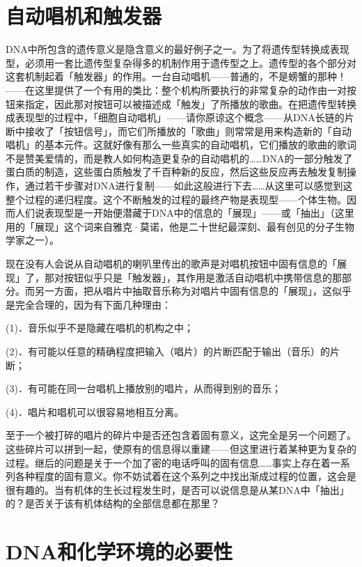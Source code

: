 \documentclass[
  12pt,
  twoside,
  openright,
  oldfontcommands,
]{memoir}
\begin{document}
\section{自动唱机和触发器}

DNA中所包含的遗传意义是隐含意义的最好例子之一。为了将遗传型转换成表现型，必须用一套比遗传型复杂得多的机制作用于遗传型之上。遗传型的各个部分对这套机制起着「触发器」的作用。一台自动唱机------普通的，不是螃蟹的那种！------在这里提供了一个有用的类比：整个机构所要执行的非常复杂的动作由一对按钮来指定，因此那对按钮可以被描述成「触发」了所播放的歌曲。在把遗传型转换成表现型的过程中，「细胞自动唱机」------请你原谅这个概念------从DNA长链的片断中接收了「按钮信号」，而它们所播放的「歌曲」则常常是用来构造新的「自动唱机」的基本元件。这就好像有那么一些真实的自动唱机，它们播放的歌曲的歌词不是赞美爱情的，而是教人如何构造更复杂的自动唱机的\ldots\ldots DNA的一部分触发了蛋白质的制造，这些蛋白质触发了千百种新的反应，然后这些反应再去触发复制操作，通过若干步骤对DNA进行复制------如此这般进行下去\ldots\ldots 从这里可以感觉到这整个过程的递归程度。这个不断触发的过程的最终产物是表现型------个体生物。因而人们说表现型是一开始便潜藏于DNA中的信息的「展现」------或「抽出」（这里用的「展现」这个词来自雅克·莫诺，他是二十世纪最深刻、最有创见的分子生物学家之一）。

现在没有人会说从自动唱机的喇叭里传出的歌声是对唱机按钮中固有信息的「展现」了，那对按钮似乎只是「触发器」，其作用是激活自动唱机中携带信息的那部分。而另一方面，把从唱片中抽取音乐称为对唱片中固有信息的「展现」，这似乎是完全合理的，因为有下面几种理由：

(1)．音乐似乎不是隐藏在唱机的机构之中；

(2)．有可能以任意的精确程度把输入（唱片）的片断匹配于输出（音乐）的片断；

(3)．有可能在同一台唱机上播放别的唱片，从而得到别的音乐；

(4)．唱片和唱机可以很容易地相互分离。

至于一个被打碎的唱片的碎片中是否还包含着固有意义，这完全是另一个问题了。这些碎片可以拼到一起，使原有的信息得以重建------但这里进行着某种更为复杂的过程。继后的问题是关于一个加了密的电话呼叫的固有信息\ldots\ldots 事实上存在着一系列各种程度的固有意义。你不妨试着在这个系列之中找出渐成过程的位置，这会是很有趣的。当有机体的生长过程发生时，是否可以说信息是从某DNA中「抽出」的？是否关于该有机体结构的全部信息都在那里？

\section{DNA和化学环境的必要性}
\end{document}
